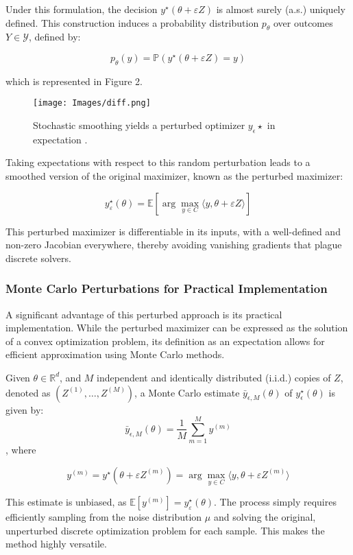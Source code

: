 Under this formulation, the decision $y^\star(\theta + \varepsilon Z)$ is almost surely (a.s.) uniquely defined. This construction induces a probability distribution $p_\theta$ over outcomes $Y \in \mathcal{Y}$, defined by: 

\[
p_\theta(y) = \mathbb{P}(y^\star(\theta + \varepsilon Z) = y) \tag{4}
\]

which is represented in Figure 2.

\begin{figure}
    \centering
    \texttt{[image: Images/diff.png]}
    \caption{Stochastic smoothing yields a perturbed optimizer \(y_\epsilon \star\) in expectation \cite{berthetLearningDifferentiablePertubed2020}.}
    \label{fig:enter-label}
\end{figure}

Taking expectations with respect to this random perturbation leads to a smoothed version of the original maximizer, known as the perturbed maximizer: 

\[
y^\star_\varepsilon(\theta) = \mathbb{E}[\arg \max_{y \in C} \langle y, \theta + \varepsilon Z \rangle] \tag{5}
\]

This perturbed maximizer is differentiable in its inputs, with a well-defined and non-zero Jacobian everywhere, thereby avoiding vanishing gradients that plague discrete solvers.

\subsubsection{Monte Carlo Perturbations for Practical Implementation}

A significant advantage of this perturbed approach is its practical implementation. While the perturbed maximizer can be expressed as the solution of a convex optimization problem, its definition as an expectation allows for efficient approximation using Monte Carlo methods. 

Given $\theta \in \mathbb{R}^d$, and $M$ independent and identically distributed (i.i.d.) copies of $Z$, denoted as $(Z^{(1)}, \dots, Z^{(M)})$, a Monte Carlo estimate $\bar{y}_{\epsilon,M}(\theta)$ of $y^\star_\epsilon(\theta)$ is given by: 
\[
\bar{y}_{\epsilon,M}(\theta) = \frac{1}{M} \sum_{m=1}^M y^{(m)} \tag{6}
\],
where

\[
y^{(m)} = y^\star(\theta + \varepsilon Z^{(m)}) = \arg \max_{y \in C} \langle y, \theta + \varepsilon Z^{(m)} \rangle \tag{7}
\]

This estimate is unbiased, as $\mathbb{E}[y^{(m)}] = y^\star_\varepsilon(\theta)$. The process simply requires efficiently sampling from the noise distribution $\mu$ and solving the original, unperturbed discrete optimization problem for each sample. This makes the method highly versatile. 

